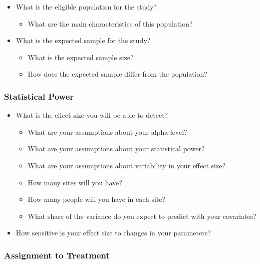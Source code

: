 \documentclass[
  letterpaper,
  DIV=11,
  numbers=noendperiod]{scrartcl}
\providecommand{\tightlist}{%
  \setlength{\itemsep}{0pt}\setlength{\parskip}{0pt}}\usepackage{longtable,booktabs,array}
\begin{document}
\begin{itemize}
\tightlist
\item
  What is the eligible population for the study?

  \begin{itemize}
  \tightlist
  \item
    What are the main characteristics of this population?
  \end{itemize}
\item
  What is the expected sample for the study?

  \begin{itemize}
  \tightlist
  \item
    What is the expected sample size?
  \item
    How does the expected sample differ from the population?
  \end{itemize}
\end{itemize}

\subsubsection{Statistical Power}\label{statistical-power}

\begin{itemize}
\tightlist
\item
  What is the effect size you will be able to detect?

  \begin{itemize}
  \tightlist
  \item
    What are your assumptions about your alpha-level?
  \item
    What are your assumptions about your statistical power?
  \item
    What are your assumptions about variability in your effect size?
  \item
    How many sites will you have?
  \item
    How many people will you have in each site?
  \item
    What share of the variance do you expect to predict with your
    covariates?
  \end{itemize}
\item
  How sensitive is your effect size to changes in your parameters?
\end{itemize}

\subsubsection{Assignment to Treatment}\label{assignment-to-treatment}
\end{document}

